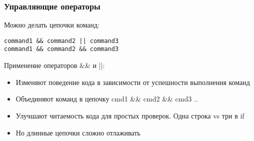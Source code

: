 \begin{frame}[fragile]
\frametitle{Управляющие операторы}
Можно делать цепочки команд:
\begin{verbatim}
command1 && command2 || command3 
command1 && command2 && command3 
\end{verbatim}

Применение операторов \&\& и ||:
\begin{itemize}
    \item Изменяют поведение кода в зависимости от успешности выполнения команд
    \item Объединяют команд в цепочку cmd1 \&\& cmd2 \&\& cmd3 .. 
    \item Улучшают читаемость кода для простых проверок.  Одна строка vs три в if
    \item Но длинные цепочки сложно отлаживать
\end{itemize}

\end{frame}
